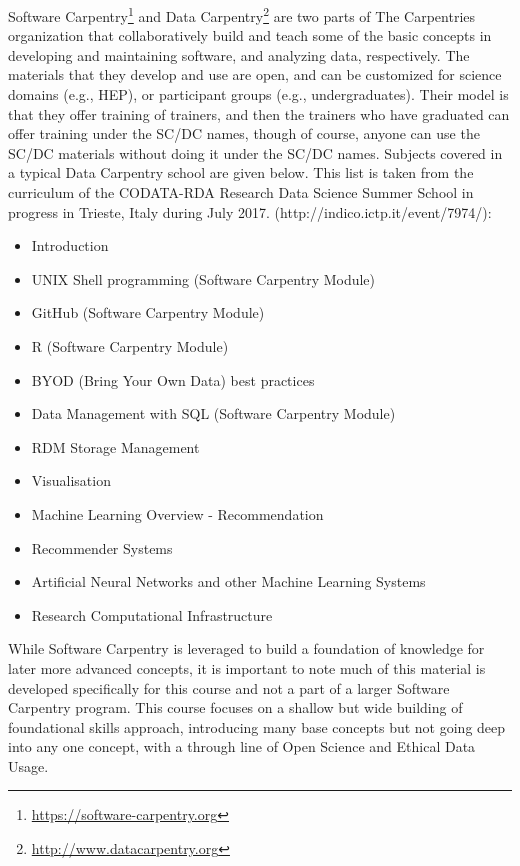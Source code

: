 \documentclass[12pt,a4paper]{article}
\begin{document}
Software Carpentry\footnote{\url{https://software-carpentry.org}} and Data
Carpentry\footnote{\url{http://www.datacarpentry.org}} are two parts of The
Carpentries organization that collaboratively build and teach some of the basic
concepts in developing and maintaining software, and analyzing data,
respectively.  The materials that they develop and use are open, and can be
customized for science domains (e.g., HEP), or participant groups (e.g.,
undergraduates). Their model is that they offer training of trainers, and then
the trainers who have graduated can offer training under the SC/DC names, though
of course, anyone can use the SC/DC materials without doing it under the SC/DC
names.
Subjects covered in a typical Data Carpentry school are given below. This list
is taken from the curriculum of the CODATA-RDA Research Data Science Summer
School in progress in Trieste, Italy during July 2017.
(http://indico.ictp.it/event/7974/):

\begin{itemize}
\item Introduction
\item UNIX Shell programming (Software Carpentry Module)
\item GitHub (Software Carpentry Module)
\item R (Software Carpentry Module)
\item BYOD (Bring Your Own Data) best practices
\item Data Management with SQL  (Software Carpentry Module)
\item RDM Storage Management
\item Visualisation
\item Machine Learning Overview - Recommendation
\item Recommender Systems
\item Artificial Neural Networks and other Machine Learning Systems 
\item Research Computational Infrastructure 
\end{itemize}

While Software Carpentry is leveraged to build a foundation of knowledge for
later more advanced concepts, it is important to note much of this material is
developed specifically for this course and not a part of a larger Software
Carpentry program. This course focuses on a shallow but wide building of
foundational skills approach, introducing many base concepts but not going deep
into any one concept, with a through line of Open Science and Ethical Data
Usage.
\end{document}
